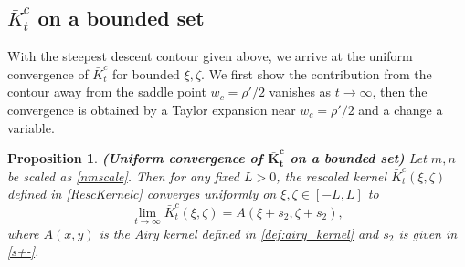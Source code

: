\documentclass[cmp]{svjour}
\numberwithin{theorem}{section}
\numberwithin{equation}{section}
\newtheorem{prop}[theorem]{Proposition}
\begin{document}
\subsection{$\bar{K}^c_t$ on a bounded set}\label{Sec:KernelUniform}


With the steepest descent contour given above, we arrive at the uniform convergence of $\bar{K}^c_t$ for bounded $\xi,\zeta$. We first show the contribution from the contour away from the saddle point $w_c=\rho'/2$ vanishes as $t\rightarrow\infty$, then the convergence is obtained by a Taylor expansion near $w_c=\rho'/2$ and a change a variable.



\medskip

\begin{prop}
\label{uniform convergence kernelc}
{\rm \textbf{(Uniform convergence of $\boldsymbol{\bar{K}_t^c}$ on a bounded set)}}
Let $m,n$ be scaled as \eqref{nmscale}. Then for any fixed $L>0$, the rescaled kernel $\bar{K}_t^{c} (\xi , \zeta)$ defined in \eqref{RescKernelc} converges uniformly on $\xi,\zeta \in [-L,L]$ to
\begin{equation}
\label{phi1 limit}
\lim_{t \rightarrow \infty}
\bar{K}_t^{c} (\xi , \zeta)
= A(\xi + s_2 , \zeta + s_2) , 
\end{equation}
where $A(x,y)$ is the Airy kernel defined in \eqref{def:airy_kernel} and $s_2$ is given in \eqref{s+-}. 
\end{prop}
\end{document}

